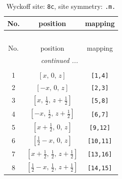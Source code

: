 \documentclass[fleqn,8pt]{jsarticle}
\begin{document}
\renewcommand{\arraystretch}{1.2}
\begin{longtable}{ccc}
\caption{Wyckoff site: {\tt 8c}, site symmetry: {\tt .m.}}
 \\
 \hline \hline
No. & position & mapping \\ \hline \endfirsthead

\multicolumn{2}{l}{\tablename\ \thetable{}} \\
 \hline \hline
No. & position & mapping \\ \hline \endhead

 \hline \hline
\multicolumn{2}{r}{\footnotesize\it continued ...} \\ \endfoot

 \hline \hline
\multicolumn{2}{r}{} \\ \endlastfoot

1 & $\left[ x,\, 0,\, z \right]$ & {\tt [1,4]} \\ \hline
2 & $\left[ - x,\, 0,\, z \right]$ & {\tt [2,3]} \\ \hline
3 & $\left[ x,\, \frac{1}{2},\, z + \frac{1}{2} \right]$ & {\tt [5,8]} \\ \hline
4 & $\left[ - x,\, \frac{1}{2},\, z + \frac{1}{2} \right]$ & {\tt [6,7]} \\ \hline
5 & $\left[ x + \frac{1}{2},\, 0,\, z \right]$ & {\tt [9,12]} \\ \hline
6 & $\left[ \frac{1}{2} - x,\, 0,\, z \right]$ & {\tt [10,11]} \\ \hline
7 & $\left[ x + \frac{1}{2},\, \frac{1}{2},\, z + \frac{1}{2} \right]$ & {\tt [13,16]} \\ \hline
8 & $\left[ \frac{1}{2} - x,\, \frac{1}{2},\, z + \frac{1}{2} \right]$ & {\tt [14,15]} \\
\end{longtable}
\renewcommand{\arraystretch}{1.2}
\end{document}
